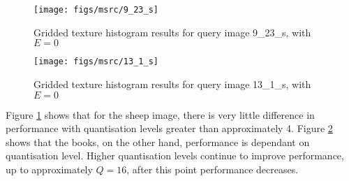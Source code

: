 \begin{figure}[ht]
	\begin{minipage}[]{0.3\linewidth}
		\centering
		\texttt{[image: figs/msrc/9\_23\_s]}
	\end{minipage}
	\begin{minipage}[]{0.7\linewidth}
		\centering
		\prplotclose
	\end{minipage}
	\caption{Gridded texture histogram results for query image 9\_23\_s, with $E=0$}
	\label{fig:grid-text-sheep}
\end{figure}

\begin{figure}[ht]
	\begin{minipage}[]{0.3\linewidth}
		\centering
		\texttt{[image: figs/msrc/13\_1\_s]}
	\end{minipage}
	\begin{minipage}[]{0.7\linewidth}
		\centering
		\prplotclose
	\end{minipage}
	\caption{Gridded texture histogram results for query image 13\_1\_s, with $E=0$}
	\label{fig:grid-text-books}
\end{figure}

Figure \ref{fig:grid-text-sheep} shows that for the sheep image, there is very little difference in performance with quantisation levels greater than approximately 4. Figure \ref{fig:grid-text-books} shows that the books, on the other hand, performance is dependant on quantisation level. Higher quantisation levels continue to improve performance, up to approximately $Q=16$, after this point performance decreases.


